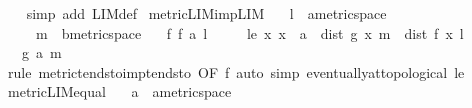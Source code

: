\begin{isabellebody}
%
\isadelimproof
\ \ %
\endisadelimproof
%
\isatagproof
{}\isamarkupfalse%
\ {\isacharparenleft}{\kern0pt}simp\ add{\isacharcolon}{\kern0pt}\ LIM{\isacharunderscore}{\kern0pt}def{\isacharparenright}{\kern0pt}%
\endisatagproof
{\isafoldproof}%
%
\isadelimproof
\isanewline
%
\endisadelimproof
\isanewline
{}\isamarkupfalse%
\ metric{\isacharunderscore}{\kern0pt}LIM{\isacharunderscore}{\kern0pt}imp{\isacharunderscore}{\kern0pt}LIM{\isacharcolon}{\kern0pt}\isanewline
\ \ \ l\ {\isacharcolon}{\kern0pt}{\isacharcolon}{\kern0pt}\ {\isachardoublequoteopen}{\isacharprime}{\kern0pt}a{\isacharcolon}{\kern0pt}{\isacharcolon}{\kern0pt}metric{\isacharunderscore}{\kern0pt}space{\isachardoublequoteclose}\isanewline
\ \ \ \ \ m\ {\isacharcolon}{\kern0pt}{\isacharcolon}{\kern0pt}\ {\isachardoublequoteopen}{\isacharprime}{\kern0pt}b{\isacharcolon}{\kern0pt}{\isacharcolon}{\kern0pt}metric{\isacharunderscore}{\kern0pt}space{\isachardoublequoteclose}\isanewline
\ \ \ f{\isacharcolon}{\kern0pt}\ {\isachardoublequoteopen}f\ {\isasymmidarrow}a{\isasymrightarrow}\ l{\isachardoublequoteclose}\isanewline
\ \ \ \ \ le{\isacharcolon}{\kern0pt}\ {\isachardoublequoteopen}{\isasymAnd}x{\isachardot}{\kern0pt}\ x\ {\isasymnoteq}\ a\ {\isasymLongrightarrow}\ dist\ {\isacharparenleft}{\kern0pt}g\ x{\isacharparenright}{\kern0pt}\ m\ {\isasymle}\ dist\ {\isacharparenleft}{\kern0pt}f\ x{\isacharparenright}{\kern0pt}\ l{\isachardoublequoteclose}\isanewline
\ \ \ {\isachardoublequoteopen}g\ {\isasymmidarrow}a{\isasymrightarrow}\ m{\isachardoublequoteclose}\isanewline
%
\isadelimproof
\ \ %
\endisadelimproof
%
\isatagproof
{}\isamarkupfalse%
\ {\isacharparenleft}{\kern0pt}rule\ metric{\isacharunderscore}{\kern0pt}tendsto{\isacharunderscore}{\kern0pt}imp{\isacharunderscore}{\kern0pt}tendsto\ {\isacharbrackleft}{\kern0pt}OF\ f{\isacharbrackright}{\kern0pt}{\isacharparenright}{\kern0pt}\ {\isacharparenleft}{\kern0pt}auto\ simp{\isacharcolon}{\kern0pt}\ eventually{\isacharunderscore}{\kern0pt}at{\isacharunderscore}{\kern0pt}topological\ le{\isacharparenright}{\kern0pt}%
\endisatagproof
{\isafoldproof}%
%
\isadelimproof
\isanewline
%
\endisadelimproof
\isanewline
{}\isamarkupfalse%
\ metric{\isacharunderscore}{\kern0pt}LIM{\isacharunderscore}{\kern0pt}equal{}{\isacharcolon}{\kern0pt}\isanewline
\ \ \ a\ {\isacharcolon}{\kern0pt}{\isacharcolon}{\kern0pt}\ {\isachardoublequoteopen}{\isacharprime}{\kern0pt}a{\isacharcolon}{\kern0pt}{\isacharcolon}{\kern0pt}metric{\isacharunderscore}{\kern0pt}space{\isachardoublequoteclose}\isanewline

\end{isabellebody}
